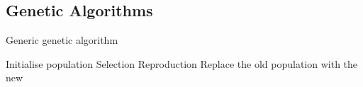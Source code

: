 \subsection{Genetic Algorithms}

\begin{algorithm}[H]
    \caption{Generic genetic algorithm}
    \begin{algorithmic}

    \State Initialise population
        \State Selection 
        \State Reproduction 
        \State Replace the old population with the new
    \EndWhile
\EndProcedure

\end{algorithmic}
\end{algorithm}
